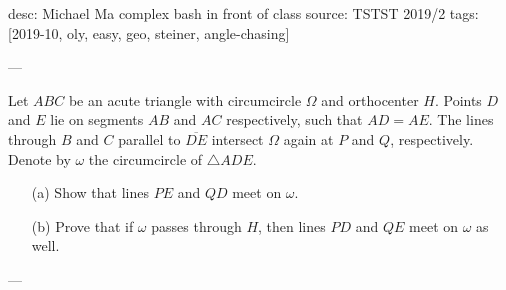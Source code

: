 desc: Michael Ma complex bash in front of class
source: TSTST 2019/2
tags: [2019-10, oly, easy, geo, steiner, angle-chasing]

---

Let $ABC$ be an acute triangle with circumcircle $\Omega$ and orthocenter $H$. Points $D$ and $E$ lie on segments $AB$ and $AC$ respectively, such that $AD=AE$. The lines through $B$ and $C$ parallel to $\overline{DE}$ intersect $\Omega$ again at $P$ and $Q$, respectively. Denote by $\omega$ the circumcircle of $\triangle ADE$.
\begin{itemize}[itemsep=0em]
    \item[(a)] Show that lines $PE$ and $QD$ meet on $\omega$.
    \item[(b)] Prove that if $\omega$ passes through $H$, then lines $PD$ and $QE$ meet on $\omega$ as well.
\end{itemize}

---


